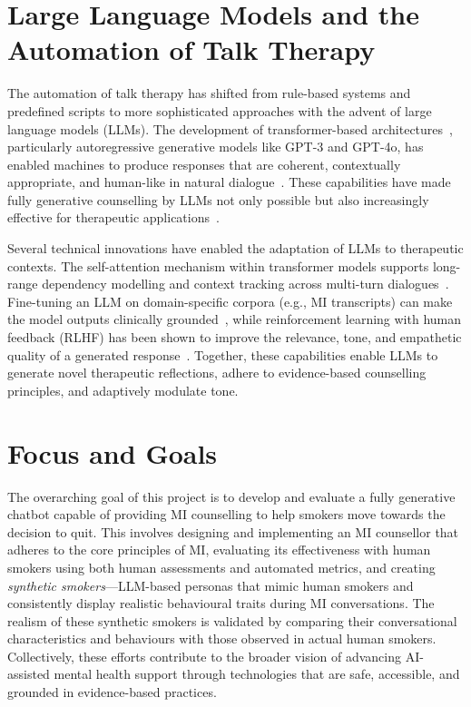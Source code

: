 \section{Large Language Models and the Automation of Talk Therapy}
The automation of talk therapy has shifted from rule-based systems and predefined scripts to more sophisticated approaches with the advent of large language models (LLMs). The development of transformer-based architectures~\cite{vaswani2017attention}, particularly autoregressive generative models like GPT-3 and GPT-4o, has enabled machines to produce responses that are coherent, contextually appropriate, and human-like in natural dialogue~\cite{openai2023gpt4}. These capabilities have made fully generative counselling by LLMs not only possible but also increasingly effective for therapeutic applications~\cite{miner2020artificial, LEE2021856}.

Several technical innovations have enabled the adaptation of LLMs to therapeutic contexts. The self-attention mechanism within transformer models supports long-range dependency modelling and context tracking across multi-turn dialogues~\cite{vaswani2017attention}. Fine-tuning an LLM on domain-specific corpora (e.g., MI transcripts) can make the model outputs clinically grounded~\cite{kong2025llmtherapistssalespeopleevaluating}, while reinforcement learning with human feedback (RLHF) has been shown to improve the relevance, tone, and empathetic quality of a generated response~\cite{10.5555/3600270.3602281}. Together, these capabilities enable LLMs to generate novel therapeutic reflections, adhere to evidence-based counselling principles, and adaptively modulate tone.

\section{Focus and Goals}
The overarching goal of this project is to develop and evaluate a fully generative chatbot capable of providing MI counselling to help smokers move towards the decision to quit. This involves designing and implementing an MI counsellor that adheres to the core principles of MI, evaluating its effectiveness with human smokers using both human assessments and automated metrics, and creating \emph{synthetic smokers}---LLM-based personas that mimic human smokers and consistently display realistic behavioural traits during MI conversations. The realism of these synthetic smokers is validated by comparing their conversational characteristics and behaviours with those observed in actual human smokers. Collectively, these efforts contribute to the broader vision of advancing AI-assisted mental health support through technologies that are safe, accessible, and grounded in evidence-based practices.

